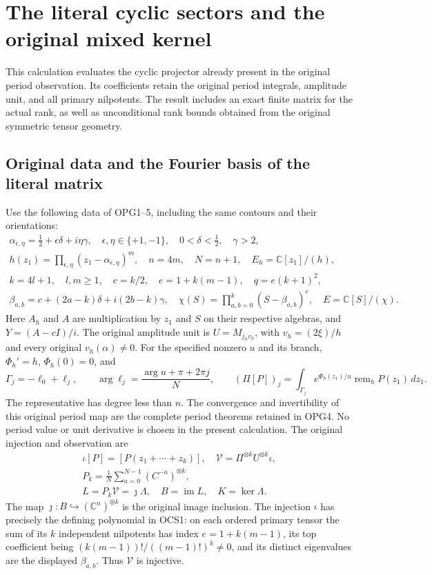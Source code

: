 \documentclass[11pt,a4paper]{article}
\begin{document}
\section{The literal cyclic sectors and the original mixed kernel}
\label{sec:OCS}

This calculation evaluates the cyclic projector already present in
the original period observation. Its coefficients retain the original
period integrals, amplitude unit, and all primary nilpotents. The
result includes an exact finite matrix for the actual rank, as well
as unconditional rank bounds obtained from the original symmetric
tensor geometry.

\subsection{Original data and the Fourier basis of the literal matrix}
Use the following data of OPG1--5, including the same contours and
their orientations:
\[
 \begin{gathered}
 \alpha_{\epsilon,\eta}=\tfrac12+\epsilon\delta+i\eta\gamma,
 \quad\epsilon,\eta\in\{+1,-1\},\quad0<\delta<\tfrac12,\quad\gamma>2,\\
 h(z_1)=\prod_{\epsilon,\eta}(z_1-\alpha_{\epsilon,\eta})^m,
 \quad n=4m,\quad N=n+1,\quad E_h=\mathbb C[z_1]/(h),\\
 k=4l+1,\quad l,m\geq1,\quad c=k/2,
 \quad e=1+k(m-1),\quad q=e(k+1)^2,\\
 \beta_{a,b}=c+(2a-k)\delta+i(2b-k)\gamma,
 \quad\chi(S)=\prod_{a,b=0}^k(S-\beta_{a,b})^e,
 \quad E=\mathbb C[S]/(\chi).
 \end{gathered}\tag{OCS1}
\]
Here $A_h$ and $A$ are multiplication by $z_1$ and $S$ on their
respective algebras, and $Y=(A-cI)/i$. The original amplitude
unit is $U=M_{j_hv_h}$, with $v_h=(2\xi)/h$ and every original
$v_h(\alpha)\ne0$. For the specified nonzero $u$ and its branch,
$\Phi_h'=h$, $\Phi_h(0)=0$, and
\[
 \Gamma_j=-\ell_0+\ell_j,\qquad
 \arg\ell_j=\frac{\arg u+\pi+2\pi j}{N},\qquad
 (\Pi[P])_j=\int_{\Gamma_j}e^{\Phi_h(z_1)/u}
                       \operatorname{rem}_hP(z_1)\,dz_1.
 \tag{OCS2}
\]
The representative has degree less than $n$. The convergence and
invertibility of this original period map are the complete period
theorems retained in OPG4. No period value or unit derivative is
chosen in the present calculation. The original injection and
observation are
\[
\begin{gathered}
 \iota[P]=[P(z_1+\cdots+z_k)],\quad
 \mathcal V=\Pi^{\otimes k}U^{\otimes k}\iota,
 \\ P_k=\frac1N\sum_{a=0}^{N-1}(C^{-a})^{\otimes k},
 \\ L=P_k\mathcal V=\jmath\Lambda,
 \quad B=\operatorname{im}L,\quad K=\ker\Lambda.
\end{gathered}\tag{OCS3}
\]
The map $\jmath:B\hookrightarrow(\mathbb C^n)^{\otimes k}$
is the original image inclusion. The injection $\iota$ has precisely
the defining polynomial in OCS1: on each ordered primary tensor
the sum of its $k$ independent nilpotents has index
$e=1+k(m-1)$, its top coefficient being
$(k(m-1))!/((m-1)!)^k\ne0$, and its distinct eigenvalues are
the displayed $\beta_{a,b}$. Thus $\mathcal V$ is injective.
\end{document}
